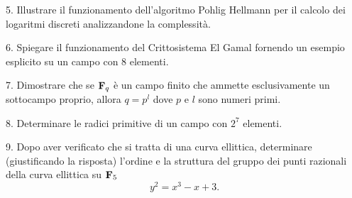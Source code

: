 \item{5.} Illustrare il funzionamento dell'algoritmo Pohlig Hellmann per il calcolo dei logaritmi discreti analizzandone
la complessit\`a.

\ve\vs

\item{6.} Spiegare il funzionamento del Crittosistema El Gamal fornendo un esempio esplicito su un campo con $8$ elementi.
\vv

\item{7.} Dimostrare che se ${\bf F}_{q}$ \`e un campo finito che ammette esclusivamente un sottocampo proprio, allora
$q=p^l$ dove $p$ e $l$ sono numeri primi. 

\ve \vs

\item{8.} Determinare le radici primitive di un campo con $2^7$ elementi.

\vv

\item{9.} Dopo aver verificato che si tratta di una curva ellittica, determinare (giustificando la risposta) l'ordine e la struttura del gruppo
dei punti razionali della curva ellittica su ${\bf F}_5$
$$y^2 = x^3-x + 3.$$
\ \vst

 \bye
